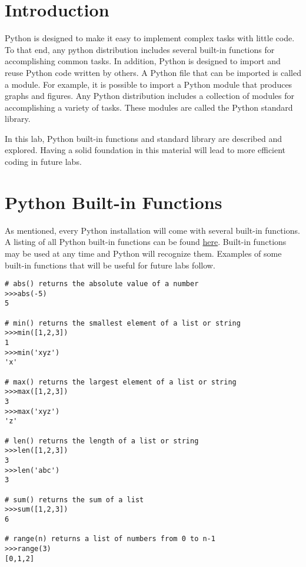 \label{lab:Standard Library}

\section*{Introduction}

Python is designed to make it easy to implement complex tasks with little code.
To that end, any python distribution includes several built-in functions for accomplishing common tasks.
In addition, Python is designed to import and reuse Python code written by others.
A Python file that can be imported is called a module.
For example, it is possible to import a Python module that produces graphs and figures.
Any Python distribution includes a collection of modules for accomplishing a variety of tasks.
These modules are called the Python standard library.

In this lab, Python built-in functions and standard library are described and explored.
Having a solid foundation in this material will lead to more efficient coding in future labs.

\section*{Python Built-in Functions}

As mentioned, every Python installation will come with several built-in functions.
A listing of all Python built-in functions can be found \href{https://docs.python.org/2/library/functions.html}{here}.
Built-in functions may be used at any time and Python will recognize them.
Examples of some built-in functions that will be useful for future labs follow.

\begin{lstlisting}
# abs() returns the absolute value of a number
>>>abs(-5)
5

# min() returns the smallest element of a list or string
>>>min([1,2,3])
1
>>>min('xyz')
'x'

# max() returns the largest element of a list or string
>>>max([1,2,3])
3
>>>max('xyz')
'z'

# len() returns the length of a list or string
>>>len([1,2,3])
3
>>>len('abc')
3

# sum() returns the sum of a list
>>>sum([1,2,3])
6

# range(n) returns a list of numbers from 0 to n-1
>>>range(3)
[0,1,2]
\end{lstlisting}

